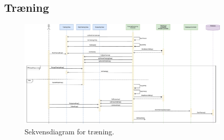 \subsection*{Træning}

\begin{figure} [H]
\centering
\includegraphics[width=0.9\textwidth]{figures/Sek/SEKTraening}
\caption{Sekvensdiagram for træning.}
\label{fig:SEKTraening}
\end{figure}